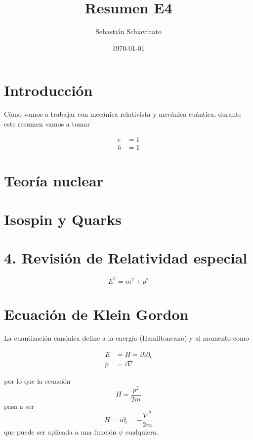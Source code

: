 \documentclass[a4paper]{article}
\title{Resumen E4}
\author{ Sebastián Schiavinato}
\date{\today}
\newcommand{\du}{\partial}
\begin{document}
\maketitle

\tableofcontents

\section{Introducción}\label{ sec:introduccion}

Cómo vamos a trabajar con mecánica relativista y mecánica cuántica, durante este resumen vamos a tomar


\noindent\noindent\[
\begin{aligned}
c &= 1\\
\hbar &= 1
\end{aligned}
\]


\section{Teoría nuclear}\label{sec:teora-nuclear}


\section{Isospin y Quarks}\label{sec:isospin-y-quarks}


\section{ 4.\hspace*{0.5em} Revisión de Relatividad especial}\label{ sec:revisin-de-relatividad-especial}
\label{eq_energy_momentum_relativistic}
\begin{equation}
E^2 = m^2 + p^2
\label{eq:energy_momentum_relativistic}
\end{equation}


\section{Ecuación de Klein Gordon}\label{ sec:klein-gordon}
La cuantización canónica define a la energía (Hamiltoneano) y al momento como

\[
\begin{aligned}
E &= H = i \hbar \du_t \\
\bar{p} &= i \nabla
\end{aligned}
\]

\noindent por lo que la ecuación
\[H = \frac{p^2}{2m}\]
pasa a ser
\begin{equation}
H = i \du_t = - \frac{\nabla^2}{2m}
\label{eq_schrodinger}
\end{equation}
\noindent que puede ser aplicada a una función  $\psi$  cualquiera.
\end{document}
